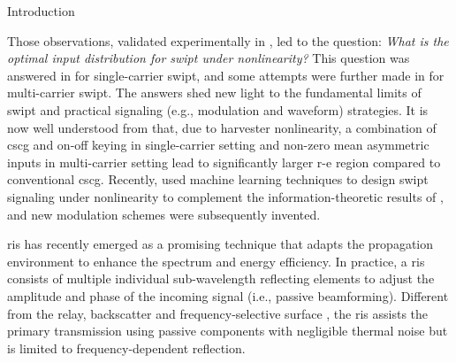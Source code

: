 \begin{section}{Introduction}
\begin{subsection}{}
		Those observations, validated experimentally in \cite{Kim2019}, led to the question: \emph{What is the optimal input distribution for \gls{swipt} under nonlinearity?} This question was answered in \cite{Varasteh2020} for single-carrier \gls{swipt}, and some attempts were further made in \cite{Varasteh2019d} for multi-carrier \gls{swipt}. The answers shed new light to the fundamental limits of \gls{swipt} and practical signaling (e.g., modulation and waveform) strategies. It is now well understood from \cite{Clerckx2018b,Varasteh2020,Varasteh2019d} that, due to harvester nonlinearity, a combination of \gls{cscg} and on-off keying in single-carrier setting and non-zero mean asymmetric inputs in multi-carrier setting lead to significantly larger \gls{r-e} region compared to conventional \gls{cscg}. Recently, \cite{Varasteh2020a} used machine learning techniques to design \gls{swipt} signaling under nonlinearity to complement the information-theoretic results of \cite{Varasteh2020}, and new modulation schemes were subsequently invented.
	\end{subsection}

	\begin{subsection}{}
		\gls{ris} has recently emerged as a promising technique that adapts the propagation environment to enhance the spectrum and energy efficiency. In practice, a \gls{ris} consists of multiple individual sub-wavelength reflecting elements to adjust the amplitude and phase of the incoming signal (i.e., passive beamforming). Different from the relay, backscatter and frequency-selective surface \cite{Anwar2018}, the \gls{ris} assists the primary transmission using passive components with negligible thermal noise but is limited to frequency-dependent reflection.


\end{subsection}
\end{section}

